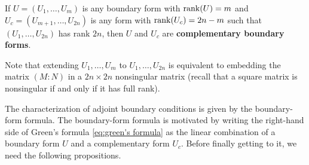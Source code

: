 \documentclass[11pt, oneside, a4paper]{article}
\begin{document}
\begin{defn}\cite[p.287]{CoddingtonLevinson}\label{defn:complementary boundary form}
    If $U=(U_1,\ldots, U_m)$ is any boundary form with $\operatorname{rank}(U)=m$ and $U_c=(U_{m+1},\ldots,U_{2n})$ is any form with $\operatorname{rank}(U_c)=2n-m$ such that $(U_1,\ldots, U_{2n})$ has rank $2n$, then $U$ and $U_c$ are \textbf{complementary boundary forms}. 
    
    Note that extending $U_{1},\ldots, U_{m}$ to $U_1,\ldots,U_{2n}$ is equivalent to embedding the matrix $(M:N)$ in a $2n\times 2n$ nonsingular matrix (recall that a square matrix is nonsingular if and only if it has full rank).
\end{defn}

The characterization of adjoint boundary conditions is given by the boundary-form formula. The boundary-form formula is motivated by writing the right-hand side of Green's formula \eqref{eq:green's formula} as the linear combination of a boundary form $U$ and a complementary form $U_c$. Before finally getting to it, we need the following propositions.
\end{document}
